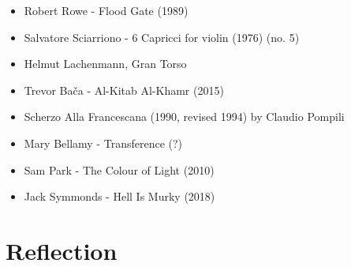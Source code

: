 \begin{itemize}
    \item Robert Rowe - Flood Gate (1989)
    \item Salvatore Sciarriono - 6 Capricci for violin (1976) (no. 5)
    \item Helmut Lachenmann, Gran Torso
    \item Trevor Bača - Al-Kitab Al-Khamr (2015)
    \item Scherzo Alla Francescana (1990, revised 1994) by Claudio Pompili 
    \item Mary Bellamy - Transference (?)
    \item Sam Park - The Colour of Light (2010)
    \item Jack Symmonds - Hell Is Murky (2018)
\end{itemize}

\section{Reflection}




\lipsum[4]